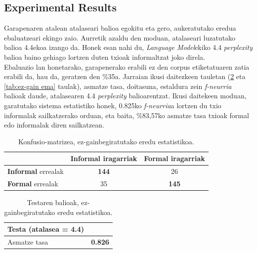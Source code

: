 \documentclass[information,article,submit,moreauthors,pdftex,10pt,a4paper]{Definitions/mdpi}
\begin{document}
\subsection{Experimental Results}\label{sec:experimental-results}



\indent Garapenaren atalean atalaseari balioa egokitu eta gero, aukeratutako eredua ebaluatzeari ekingo zaio. Aurretik azaldu den moduan, atalaseari luzatutako balioa 4.4ekoa izango da. Honek esan nahi du, \textit{Language Model}ekiko 4.4 \textit{perplexity} balioa baino gehiago lortzen duten txioak informaltzat joko direla.\\
\indent Ebaluazio lan honetarako, garapenerako erabili ez den corpus etiketatuaren zatia erabili da, hau da, geratzen den \%35a. Jarraian ikusi daitezkeen tauletan (\ref{tab:Test ez-gain} eta \ref{tab:ez-gain ema} taulak), asmatze tasa, doitasuna, estaldura zein \textit{f-neurria} balioak daude, atalasearen 4.4 \textit{perplexity} balioarentzat. Ikusi daitekeen moduan, garatutako sistema estatistiko honek, 0.825ko \textit{f-neurria}a lortzen du txio informalak sailkatzerako orduan, eta baita, \%83,57ko asmatze tasa txioak formal edo informalak diren sailkatzean.

\begin{table}[H]
  \centering
  \begin{tabular}{|l|c|c|}
    \hline
    & \textbf{Informal} iragarriak & \textbf{Formal} iragarriak \\ \hline 
    \textbf{Informal} errealak & \textbf{144} & 26\\ \hline
    \textbf{Formal} errealak & 35 & \textbf{145}\\ \hline
  \end{tabular}
  \caption{Konfusio-matrizea, ez-gainbegiratutako eredu estatistikoa.}
  \label{tab:ez-gain cm}
\end{table}

\begin{table}[H]
  \centering
  \begin{tabular}{|l|r|}
    \hline
    \textbf{Testa (atalasea = 4.4)} &  \\ \hline 
    Asmatze tasa & \textbf{0.826} \\ \hline
  \end{tabular}
  \caption{Testaren balioak, ez-gainbegiratutako eredu estatistikoa.}
  \label{tab:Test ez-gain}
\end{table}
\end{document}
